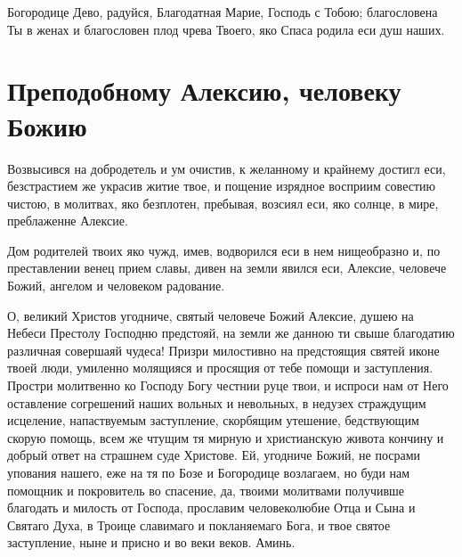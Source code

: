 \begin{mymulticols}
Богородице Дево, радуйся, Благодатная Марие, Господь с Тобою; благословена Ты в женах и благословен плод чрева Твоего, яко Спаса родила еси душ наших.

\end{mymulticols}

\mychapterending


 

\section{Преподобному Алексию, человеку Божию}\begin{mymulticols}
 


Возвысився на добродетель и ум очистив, к желанному и крайнему достигл еси, безстрастием же украсив житие твое, и пощение изрядное восприим совестию чистою, в молитвах, яко безплотен, пребывая, возсиял еси, яко солнце, в мире, преблаженне Алексие.


Дом родителей твоих яко чужд, имев, водворился еси в нем нищеобразно и, по преставлении венец прием славы, дивен на земли явился еси, Алексие, человече Божий, ангелом и человеком радование.


О, великий Христов угодниче, святый человече Божий Алексие, душею на Небеси Престолу Господню предстояй, на земли же данною ти свыше благодатию различная совершаяй чудеса! Призри милостивно на предстоящия святей иконе твоей люди, умиленно молящияся и просящия от тебе помощи и заступления. Простри молитвенно ко Господу Богу честнии руце твои, и испроси нам от Него оставление согрешений наших вольных и невольных, в недузех страждущим исцеление, напаствуемым заступление, скорбящим утешение, бедствующим скорую помощь, всем же чтущим тя мирную и христианскую живота кончину и добрый ответ на страшнем суде Христове. Ей, угодниче Божий, не посрами упования нашего, еже на тя по Бозе и Богородице возлагаем, но буди нам помощник и покровитель во спасение, да, твоими молитвами получивше благодать и милость от Господа, прославим человеколюбие Отца и Сына и Святаго Духа, в Троице славимаго и покланяемаго Бога, и твое святое заступление, ныне и присно и во веки веков. Аминь.

\end{mymulticols}

